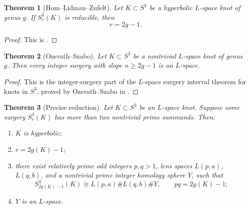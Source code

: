 \documentclass[11pt]{article}
\newtheorem{theorem}{Theorem}[section]
\theoremstyle{definition}
\theoremstyle{remark}
\begin{document}
\begin{theorem}[Hom--Lidman--Zufelt]\label{thm:HLZ}
Let \(K\subset S^{3}\) be a hyperbolic \(L\)-space knot of genus \(g\).
If \(S^{3}_{r}(K)\) is reducible, then
\[
        r=2g-1 .
\]
\end{theorem}

\begin{proof}
This is \cite[Theorem 1.3]{HLZ}.
\end{proof}

\begin{theorem}[Ozsvath--Szabo]\label{thm:OSinterval}
Let \(K\subset S^{3}\) be a nontrivial \(L\)-space knot of genus \(g\).
Then every integer surgery with slope \(n\ge 2g-1\) is an \(L\)-space.
\end{theorem}

\begin{proof}
This is the integer-surgery part of the \(L\)-space surgery interval theorem
for knots in \(S^{3}\), proved by Ozsvath--Szabo in
\cite[Proposition 9.6]{OSLens}.
\end{proof}

\begin{theorem}[Precise reduction]\label{thm:reduction}
Let \(K\subset S^{3}\) be an \(L\)-space knot.  Suppose some surgery
\(S^{3}_{r}(K)\) has more than two nontrivial prime summands.  Then:
\begin{enumerate}[label=(\roman*)]
\item \(K\) is hyperbolic;
\item \(r=2g(K)-1\);
\item there exist relatively prime odd integers \(p,q>1\), lens spaces
\(L(p,a)\), \(L(q,b)\), and a nontrivial prime integer homology sphere
\(Y\), such that
\[
        S^{3}_{2g(K)-1}(K)\cong L(p,a)\#L(q,b)\#Y,
        \qquad pq=2g(K)-1;
\]
\item \(Y\) is an \(L\)-space.
\end{enumerate}
\end{theorem}
\end{document}
